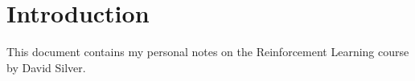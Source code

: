 \section{Introduction}

This document contains my personal notes on the Reinforcement Learning course by David Silver.
